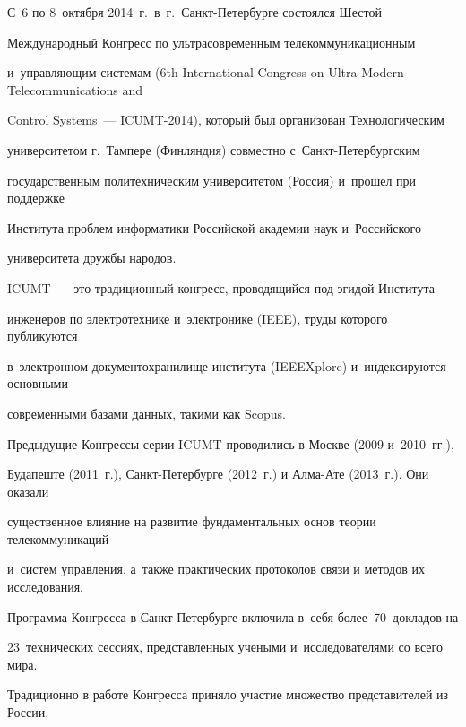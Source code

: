 \vspace*{6pt}





   С~6 по 8~октября 2014~г.\ в~г.~Санкт-Пе\-тер\-бур\-ге состоялся Шестой


Международный Конгресс по ультрасовременным телекоммуникационным


и~управляющим системам (6th International Congress on Ultra Modern Telecommunications and


Control Systems~--- ICUMT-2014), который был организован Технологическим


университетом г.~Тампере (Финляндия) совместно с~Санкт-Пе\-тер\-бург\-ским


государственным политехническим университетом (Россия) и~прошел при поддержке


Института проблем информатики Российской академии наук и~Российского


университета дружбы народов.





   ICUMT~--- это традиционный конгресс, проводящийся под эгидой Института


инженеров по электротехнике и~электронике (IEEE), труды которого публикуются


в~электронном документохранилище института (IEEEXplore) и~индексируются основными


современными базами данных, такими как Scopus.










   Предыдущие Конгрессы серии ICUMT проводились в Москве (2009 и~2010~гг.),


Будапеште (2011~г.), Санкт-Пе\-тер\-бур\-ге (2012~г.) и Алма-Ате (2013~г.). Они оказали


существенное влияние на развитие фундаментальных основ теории телекоммуникаций


и~систем управления, а~так\-же практических протоколов связи и методов их исследования.


Программа Конгресса в Санкт-Пе\-тер\-бур\-ге включила в~себя более~70~докладов на


23~технических сессиях, представленных учеными и~исследователями со всего мира.


Традиционно в работе Конгресса приняло участие множество представителей из России,



